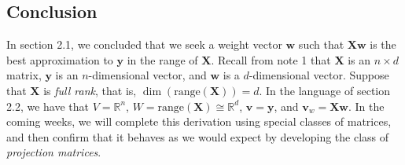 \documentclass{article}
\newcommand{\R}{\mathbb{R}}
\newcommand{\tit}{\textit}
\begin{document}
\subsection*{Conclusion}
In section 2.1, we concluded that we seek a weight vector $\mathbf{w}$ such that $\mathbf{Xw}$ is the best approximation to $\mathbf{y}$ in the range of $\mathbf{X}$. Recall from note 1 that $\mathbf{X}$ is an $n\times d$ matrix, $\mathbf{y}$ is an $n$-dimensional vector, and $\mathbf{w}$ is a $d$-dimensional vector. Suppose that $\mathbf{X}$ is \tit{full rank}, that is, $\dim(\text{range}(\mathbf{X})) = d$. In the language of section 2.2, we have that $V = \R^n$, $W = \text{range}(\mathbf{X}) \cong \R^d$, $\mathbf{v} = \mathbf{y}$, and $\mathbf{v}_w = \mathbf{Xw}$. In the coming weeks, we will complete this derivation using special classes of matrices, and then confirm that it behaves as we would expect by developing the class of \tit{projection matrices}.
\end{document}
